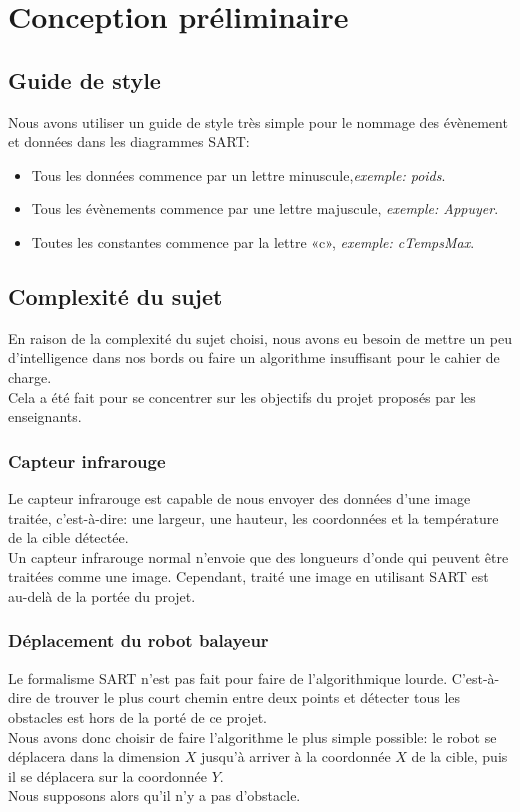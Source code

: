 
\section{Conception préliminaire}

\subsection{Guide de style}
Nous avons utiliser un guide de style très simple pour le nommage des évènement et données dans les diagrammes SART:

\begin{itemize}
\item Tous les données commence par un lettre minuscule,{\sl exemple: poids}.
\item Tous les évènements commence par une lettre majuscule, {\sl exemple: Appuyer}.
\item Toutes les constantes commence par la lettre  «c», {\sl exemple: cTempsMax}.
\end{itemize}

\subsection{Complexité du sujet}
En raison de la complexité du sujet choisi, nous avons eu besoin de mettre un peu d'intelligence dans nos bords
ou faire un algorithme insuffisant pour le cahier de charge. \\
Cela a été fait pour se concentrer sur les objectifs du projet proposés par les enseignants.

\subsubsection{Capteur infrarouge}
Le capteur infrarouge est capable de nous envoyer des données d'une image traitée, c'est-à-dire: une largeur,
une hauteur, les coordonnées et la température de la cible détectée. \\
Un capteur infrarouge normal n'envoie que des longueurs d'onde qui peuvent être traitées comme une image.
Cependant, traité une image en utilisant SART est au-delà de la portée du projet.

\subsubsection{Déplacement du robot balayeur}
Le formalisme SART n'est pas fait pour faire de l'algorithmique lourde. C'est-à-dire de trouver le plus court
chemin entre deux points et détecter tous les obstacles est hors de la porté de ce projet. \\
Nous avons donc choisir de faire l'algorithme le plus simple possible: le robot se
déplacera dans la dimension $X$ jusqu'à arriver à la coordonnée $X$ de la cible, puis il se déplacera sur la coordonnée $Y$. \\
Nous supposons alors qu'il n'y a pas d'obstacle.


\vfill
\pagebreak
